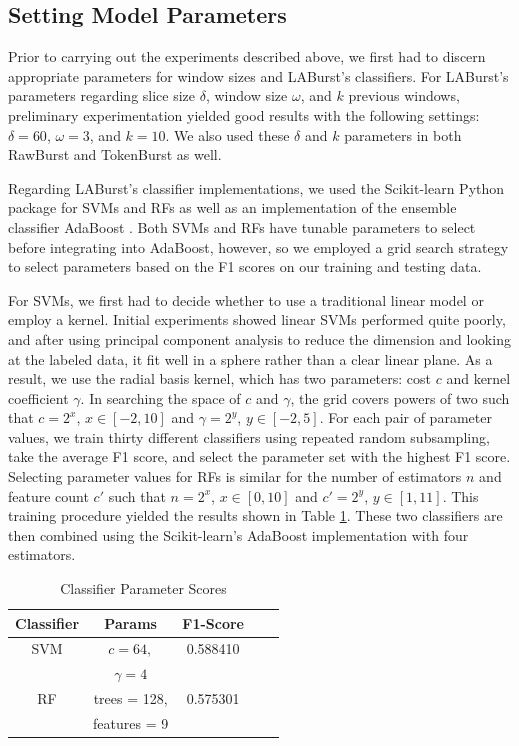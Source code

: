 \documentclass[letterpaper]{article}
\begin{document}
\subsection{Setting Model Parameters}

Prior to carrying out the experiments described above, we first had to discern appropriate parameters for window sizes and LABurst's classifiers.
For LABurst's parameters regarding slice size $\delta$, window size $\omega$, and $k$ previous windows, preliminary experimentation yielded good results with the following settings: $\delta = 60$, $\omega = 3$, and $k=10$.
We also used these $\delta$ and $k$ parameters in both RawBurst and TokenBurst as well.

Regarding LABurst's classifier implementations, we used the Scikit-learn Python package for SVMs and RFs as well as an implementation of the ensemble classifier AdaBoost \cite{scikit-learn}.
Both SVMs and RFs have tunable parameters to select before integrating into AdaBoost, however, so we employed a grid search strategy to select parameters based on the F1 scores on our training and testing data.

For SVMs, we first had to decide whether to use a traditional linear model or employ a kernel.
Initial experiments showed linear SVMs performed quite poorly, and after using principal component analysis to reduce the dimension and looking at the labeled data, it fit well in a sphere rather than a clear linear plane. 
As a result, we use the radial basis kernel, which has two parameters: cost $c$ and kernel coefficient $\gamma$.
In searching the space of $c$ and $\gamma$, the grid covers powers of two such that $c = 2^x$, $x \in [-2, 10]$ and $\gamma = 2^y$, $y \in [-2, 5]$.
For each pair of parameter values, we train thirty different classifiers using repeated random subsampling, take the average F1 score, and select the parameter set with the highest F1 score.
Selecting parameter values for RFs is similar for the number of estimators $n$ and feature count $c'$ such that $n = 2^x$, $x \in [0, 10]$ and $c' = 2^y$, $y \in [1, 11]$.
This training procedure yielded the results shown in Table \ref{tab:scores}.
These two classifiers are then combined using the Scikit-learn's AdaBoost implementation with four estimators.

\begin{table}[htdp]
\caption{Classifier Parameter Scores}
\begin{center}
\begin{tabular}{|c|c|c|c|c|}
\hline
\textbf{Classifier} & \textbf{Params} & \textbf{F1-Score} \\ \hline
SVM & $c=64,$ & 0.588410 \\ 
& $\gamma=4$ & \\ \hline
RF & trees = 128, & 0.575301 \\
& features = 9 &  \\ \hline
\end{tabular}
\end{center}
\label{tab:scores}
\end{table}
\end{document}
